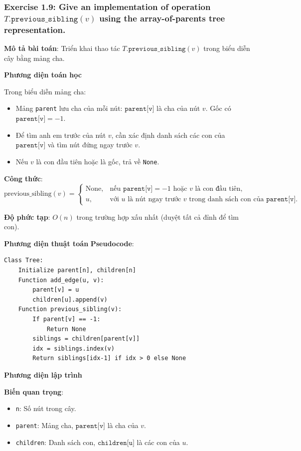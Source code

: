 \documentclass[a4paper,12pt]{article}
\begin{document}
\subsubsection{Exercise 1.9: Give an implementation of operation $T.\texttt{previous\_sibling}(v)$ using the array-of-parents tree representation.}
\textbf{Mô tả bài toán}: Triển khai thao tác \( T.\texttt{previous\_sibling}(v) \) trong biểu diễn cây bằng mảng cha.

\textbf{Phương diện toán học}

Trong biểu diễn mảng cha:
\begin{itemize}
    \item Mảng \texttt{parent} lưu cha của mỗi nút: \(\texttt{parent[v]}\) là cha của nút \(v\). Gốc có \(\texttt{parent[v]} = -1\).
    \item Để tìm anh em trước của nút \(v\), cần xác định danh sách các con của \(\texttt{parent[v]}\) và tìm nút đứng ngay trước \(v\).
    \item Nếu \(v\) là con đầu tiên hoặc là gốc, trả về \texttt{None}.
\end{itemize}

\textbf{Công thức}:
\[
\text{previous\_sibling}(v) =
\begin{cases} 
\mathrm{None}, & \text{nếu } \texttt{parent[v]} = -1 \text{ hoặc } v \text{ là con đầu tiên}, \\[6pt]
u, & \text{với } u \text{ là nút ngay trước } v \text{ trong danh sách con của } \texttt{parent[v]}.
\end{cases}
\]

\textbf{Độ phức tạp}: \( O(n) \) trong trường hợp xấu nhất (duyệt tất cả đỉnh để tìm con).

\textbf{Phương diện thuật toán}
\textbf{Pseudocode}:
\begin{verbatim}
Class Tree:
    Initialize parent[n], children[n]
    Function add_edge(u, v):
        parent[v] = u
        children[u].append(v)
    Function previous_sibling(v):
        If parent[v] == -1:
            Return None
        siblings = children[parent[v]]
        idx = siblings.index(v)
        Return siblings[idx-1] if idx > 0 else None
\end{verbatim}

\textbf{Phương diện lập trình}

\textbf{Biến quan trọng}:
\begin{itemize}
    \item \texttt{n}: Số nút trong cây.
    \item \texttt{parent}: Mảng cha, \( \texttt{parent[v]} \) là cha của \( v \).
    \item \texttt{children}: Danh sách con, \( \texttt{children[u]} \) là các con của \( u \).
\end{itemize}
\end{document}

